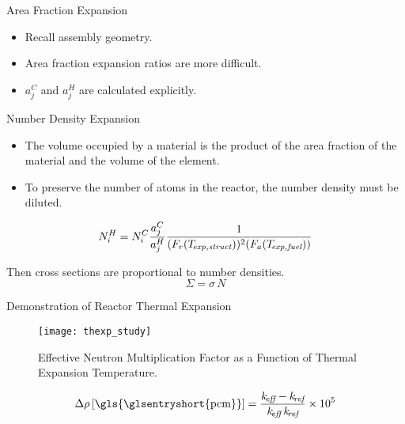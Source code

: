 \begin{frame}{Area Fraction Expansion}
  \begin{itemize}
    \item Recall assembly geometry.
    \item Area fraction expansion ratios are more difficult.
    \item $a_j^C$ and $a_j^H$ are calculated explicitly.
  \end{itemize}

  \begin{figure}
    \centering
    \hspace{0.2in}
    \label{fig:assy_geometry}
  \end{figure}
\end{frame}

\begin{frame}{Number Density Expansion}
  \begin{itemize}
    \item The volume occupied by a material is the product of the 
      area fraction of the material and the volume of the element.
    \item To preserve the number of atoms in the reactor, the number density 
      must be diluted.
  \end{itemize}
  \begin{equation}
    \label{eq:nden_thexp_update}
    N_i^H = N_i^C \frac{a_j^C}{a_j^H} 
      \frac{1}{(F_r(T_{\!\mbox{\scriptsize \em exp,struct}}))^2 (F_a({T_{\!\mbox{\scriptsize \em exp,fuel}}}))}
  \end{equation}

  Then cross sections are proportional to number densities.
  \begin{equation}
    \Sigma = \sigma \, N
  \end{equation}
\end{frame}

\begin{frame}{Demonstration of Reactor Thermal Expansion}
  \begin{figure}
    \centering
    \texttt{[image: thexp\_study]}
    \caption{Effective Neutron Multiplication Factor as a Function of 
      Thermal Expansion Temperature.}
    \label{fig:thexp_study}
  \end{figure}
  \begin{equation}
    \label{eq:reactivity_formula}
    \Delta \rho \units{\gls{\glsentryshort{pcm}}} = \frac{\keff - \kref}{\keff \, \kref} \times
      10^5
  \end{equation}
\end{frame}
